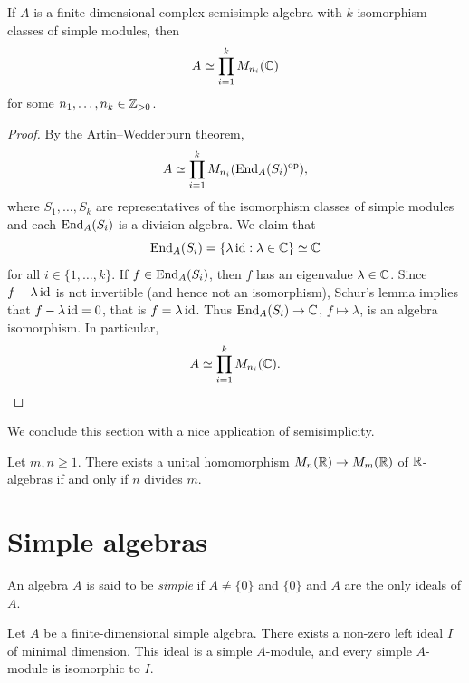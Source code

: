 \begin{corollary}[Molien]
	If $A$ is a finite-dimensional complex semisimple algebra
	with $k$ isomorphism classes of simple modules, 
	then 
	\[
	A\simeq\prod_{i=1}^k M_{n_i}(\mathbb{C})
	\]  
	for some $n_1,\dots,n_k\in\mathbb{Z}_{>0}$. 
\end{corollary}

\begin{proof}
	By the Artin--Wedderburn theorem,  
	\[
	A\simeq \prod_{i=1}^k M_{n_i}(\operatorname{End}_A(S_i)^{\operatorname{op}}),
	\]
	where $S_1,\dots,S_k$ are representatives of the isomorphism classes of simple modules
	and each $\operatorname{End}_A(S_i)$ is a division algebra. We claim that 
	\[
	\operatorname{End}_A(S_i)=\{\lambda\operatorname{id}:\lambda\in\mathbb{C}\}\simeq\mathbb{C}
	\]
	for all $i\in\{1,\dots,k\}$. If  
	$f\in\operatorname{End}_A(S_i)$, then $f$ has an eigenvalue $\lambda\in\mathbb{C}$. Since  
	$f-\lambda\operatorname{id}$ is not invertible (and hence not an isomorphism), Schur's lemma implies that $f-\lambda\operatorname{id}=0$, 
	that is $f=\lambda\operatorname{id}$. Thus $\operatorname{End}_A(S_i)\to\mathbb{C}$, $f\mapsto\lambda$, 
	is an algebra isomorphism. In particular,  
	\[
	A\simeq \prod_{i=1}^k M_{n_i}(\mathbb{C}).\qedhere
	\]
\end{proof}

We conclude this section with a nice
application of semisimplicity.

\begin{exercise}
	\label{xca:matrices}
  Let $m,n\geq1$. 
	There exists a unital 
	homomorphism $M_n(\mathbb{R})\to M_m(\mathbb{R})$ of $\mathbb{R}$-algebras 
	if and only 
	if $n$ divides $m$. 
\end{exercise}





\section{Simple algebras}

\begin{definition}
    An algebra $A$ is said to be \emph{simple} if $A\ne\{0\}$ and $\{0\}$ and $A$ are the only ideals of $A$. 
\end{definition}

\begin{proposition}
\label{pro:unique_simple}
	Let $A$ be a finite-dimensional simple algebra. There exists a non-zero left ideal 
	$I$ of minimal dimension. This ideal is a simple 
	$A$-module, and every simple $A$-module is isomorphic to $I$.
\end{proposition}

